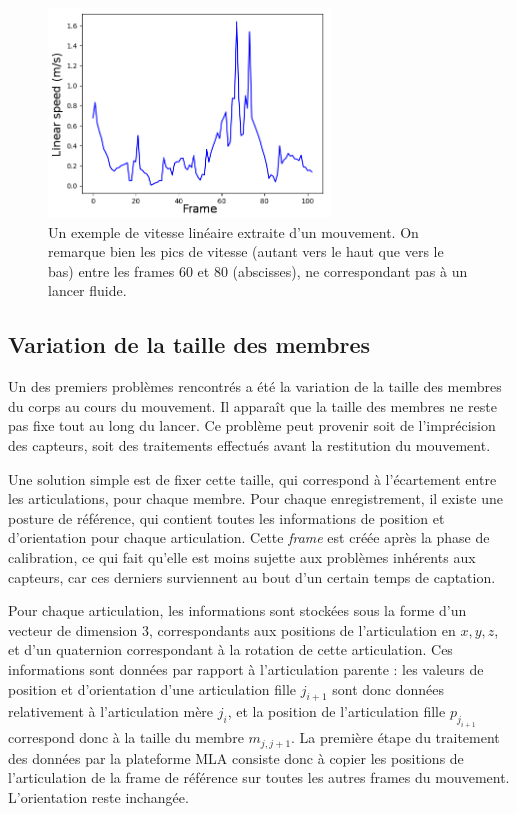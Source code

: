\begin{figure}
	\centering
    \includegraphics[width=7.5cm]{pictures/linear_speed_artifacts.png}
    \caption[Vitesse linéaire avec artéfacts]{Un exemple de vitesse linéaire extraite d'un mouvement. On remarque bien les pics de vitesse (autant vers le haut que vers le bas) entre les frames 60 et 80 (abscisses), ne correspondant pas à un lancer fluide.}
    \label{fig:linear_speed_artifacts}
\end{figure}

\subsection{Variation de la taille des membres}
Un des premiers problèmes rencontrés a été la variation de la taille des membres du corps au cours du mouvement. Il apparaît que la taille des membres ne reste pas fixe tout au long du lancer. Ce problème peut provenir soit de l'imprécision des capteurs, soit des traitements effectués avant la restitution du mouvement.

Une solution simple est de fixer cette taille, qui correspond à l'écartement entre les articulations, pour chaque membre. Pour chaque enregistrement, il existe une posture de référence, qui contient toutes les informations de position et d'orientation pour chaque articulation. Cette \textit{frame} est créée après la phase de calibration, ce qui fait qu'elle est moins sujette aux problèmes inhérents aux capteurs, car ces derniers surviennent au bout d'un certain temps de captation.

Pour chaque articulation, les informations sont stockées sous la forme d'un vecteur de dimension 3, correspondants aux positions de l'articulation en $x, y, z$, et d'un quaternion correspondant à la rotation de cette articulation. Ces informations sont données par rapport à l'articulation parente : les valeurs de position et d'orientation d'une articulation fille $j_{i+1}$ sont donc données relativement à l'articulation mère $j_i$, et la position de l'articulation fille $p_{j_{i+1}}$ correspond donc à la taille du membre $m_{j, j+1}$. La première étape du traitement des données par la plateforme MLA consiste donc à copier les positions de l'articulation de la frame de référence sur toutes les autres frames du mouvement. L'orientation reste inchangée.

